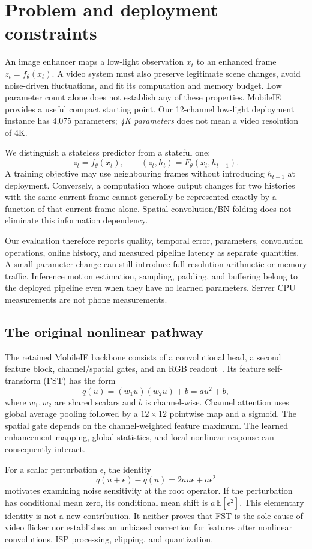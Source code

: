\section{Problem and deployment constraints}
\label{sec:problem}
An image enhancer maps a low-light observation $x_t$ to an enhanced frame
$z_t=f_\theta(x_t)$. A video system must also preserve legitimate scene changes,
avoid noise-driven fluctuations, and fit its computation and memory budget.
Low parameter count alone does not establish any of these properties.
MobileIE~\cite{mobileie} provides a useful compact starting point. Our
12-channel low-light deployment instance has 4,075 parameters; \emph{4K parameters}
does not mean a video resolution of $4\mathrm{K}$.

We distinguish a stateless predictor from a stateful one:
\[
 z_t=f_\theta(x_t),\qquad
 (z_t,h_t)=F_\theta(x_t,h_{t-1}).
\]
A training objective may use neighbouring frames without introducing
$h_{t-1}$ at deployment. Conversely, a computation whose output changes for
two histories with the same current frame cannot generally be represented
exactly by a function of that current frame alone. Spatial convolution/BN
folding does not eliminate this information dependency.

Our evaluation therefore reports quality, temporal error, parameters,
convolution operations, online history, and measured pipeline latency as
separate quantities. A small parameter change can still introduce
full-resolution arithmetic or memory traffic. Inference motion estimation,
sampling, padding, and buffering belong to the deployed pipeline even when
they have no learned parameters. Server CPU measurements are not phone
measurements.

\subsection{The original nonlinear pathway}
The retained MobileIE backbone consists of a convolutional head, a second
feature block, channel/spatial gates, and an RGB readout~\cite{mobileie}.
Its feature self-transform (FST) has the form
\[
 q(u)=(w_1u)(w_2u)+b=a u^2+b,
\]
where $w_1,w_2$ are shared scalars and $b$ is channel-wise. Channel attention
uses global average pooling followed by a $12\!\times\!12$ pointwise map and
a sigmoid. The spatial gate depends on the channel-weighted feature maximum.
The learned enhancement mapping, global statistics, and local nonlinear
response can consequently interact.

For a scalar perturbation $\epsilon$, the identity
\[
 q(u+\epsilon)-q(u)=2au\epsilon+a\epsilon^2
\]
motivates examining noise sensitivity at the root operator. If the
perturbation has conditional mean zero, its conditional mean shift is
$a\,\mathbb E[\epsilon^2]$. This elementary identity is not a new
contribution. It neither proves that FST is the sole cause of video flicker
nor establishes an unbiased correction for features after nonlinear
convolutions, ISP processing, clipping, and quantization.

